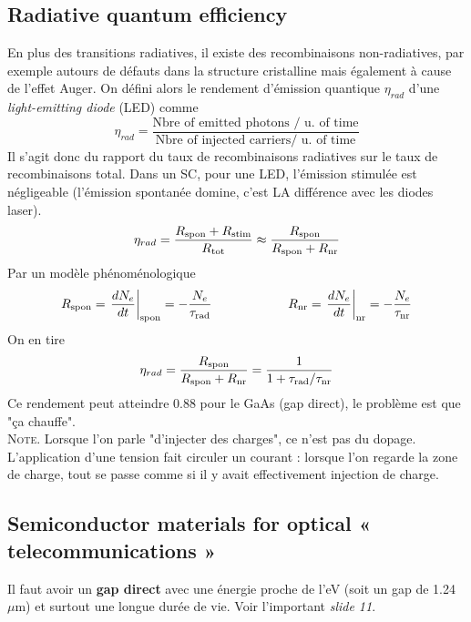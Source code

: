 \subsection{Radiative quantum efficiency}
En plus des transitions radiatives, il existe des recombinaisons non-radiatives, par exemple autours
de défauts dans la structure cristalline mais également à cause de l'effet Auger. On défini alors
le rendement d'émission quantique $\eta_{rad}$ d'une \textit{light-emitting diode} (LED) comme
\begin{equation}
\eta_{rad} = \dfrac{\text{Nbre of emitted photons / u. of time}}{\text{Nbre of injected carriers/ u. of time}}
\end{equation}
Il s'agit donc du rapport du taux de recombinaisons radiatives sur le taux de recombinaisons total. 
Dans un SC, pour une LED, l'émission stimulée est négligeable (l'émission spontanée domine, c'est
LA différence avec les diodes laser).
\begin{equation}
{\eta _{rad}} = \frac{{{R_{{\rm{spon}}}} + {R_{{\rm{stim}}}}}}{{{R_{{\rm{tot}}}}}} \approx \frac{{{R_{{\rm{spon}}}}}}{{{R_{{\rm{spon}}}} + {R_{{\rm{nr}}}}}}
\end{equation}
Par un modèle phénoménologique
\begin{equation}
{R_{{\rm{spon}}}} = {\left. {\frac{{d{N_e}}}{{dt}}} \right|_{{\rm{spon}}}} =  - \frac{{{N_e}}}{{{\tau _{{\rm{rad}}}}}}\qquad\qquad\qquad
{R_{{\rm{nr}}}} = {\left. {\frac{{d{N_e}}}{{dt}}} \right|_{{\rm{nr}}}} =  - \frac{{{N_e}}}{{{\tau _{{\rm{nr}}}}}}
\end{equation}
On en tire
\begin{equation}
{\eta _{rad}} = \frac{{{R_{{\rm{spon}}}}}}{{{R_{{\rm{spon}}}} + {R_{{\rm{nr}}}}}} = \frac{1}{{1 + {\tau _{{\rm{rad}}}}/{\tau _{{\rm{nr}}}}}}
\end{equation}
Ce rendement peut atteindre 0.88 pour le GaAs (gap direct), le problème est que "ça chauffe". \\

\textsc{Note}. Lorsque l'on parle "d'injecter des charges", ce n'est pas du dopage. L'application 
d'une tension fait circuler un courant : lorsque l'on regarde la zone de charge, tout se passe comme
si il y avait effectivement injection de charge.


\subsection{Semiconductor materials for optical « telecommunications »}
Il faut avoir un \textbf{gap direct} avec une énergie proche de l'eV (soit un gap de 1.24 $\mu$m) 
et surtout une longue durée de vie. Voir l'important \textit{slide 11}.


